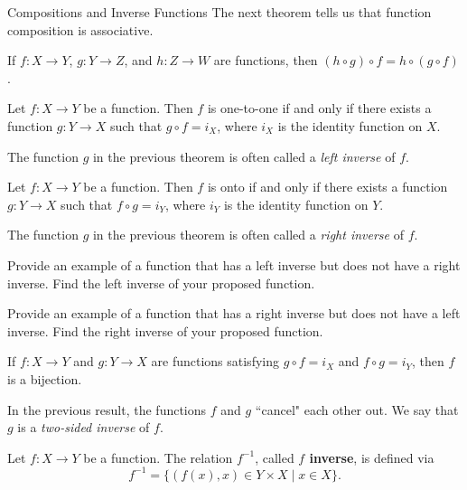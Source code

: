 \begin{section}{Compositions and Inverse Functions}
The next theorem tells us that function composition is associative.

\begin{theorem}
If $f:X\to Y$, $g:Y\to Z$, and $h:Z\to W$ are functions, then $(h\circ g)\circ f = h\circ (g\circ f)$.
\end{theorem}

\begin{theorem}
Let $f:X\to Y$ be a function. Then $f$ is one-to-one if and only if there exists a function $g:Y\to X$ such that $g\circ f=i_X$, where $i_X$ is the identity function on $X$.
\end{theorem}

The function $g$ in the previous theorem is often called a \emph{left inverse} of $f$.

\begin{theorem}
Let $f:X\to Y$ be a function. Then $f$ is onto if and only if there exists a function $g:Y\to X$ such that $f\circ g=i_Y$, where $i_Y$ is the identity function on $Y$.
\end{theorem}

The function $g$ in the previous theorem is often called a \emph{right inverse} of $f$.

\begin{exercise}
Provide an example of a function that has a left inverse but does not have a right inverse. Find the left inverse of your proposed function.
\end{exercise}

\begin{exercise}
Provide an example of a function that has a right inverse but does not have a left inverse. Find the right inverse of your proposed function.
\end{exercise}

\begin{corollary}\label{cor:two-sided inverse}
If $f:X\to Y$ and $g:Y\to X$ are functions satisfying $g\circ f=i_X$ and  $f\circ g=i_Y$, then $f$ is a bijection.
\end{corollary}

In the previous result, the functions $f$ and $g$ ``cancel" each other out. We say that $g$ is a \emph{two-sided inverse} of $f$.

\begin{definition}
Let $f:X\to Y$ be a function.  The relation $f^{-1}$, called \textbf{$f$ inverse}, is defined via
\[
f^{-1}=\{(f(x),x)\in Y\times X\mid x\in X\}.
\]
\end{definition}


\end{section}

